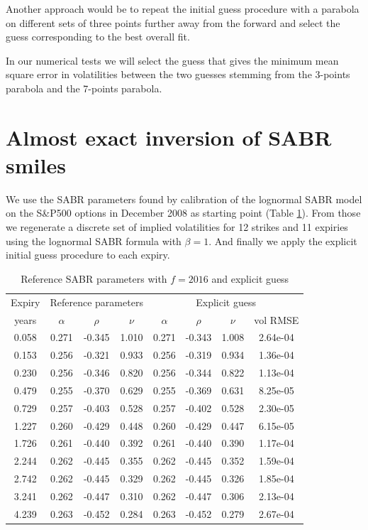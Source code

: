 \documentclass[]{rAMF2e}
\begin{document}
Another approach would be to repeat the initial guess procedure with a parabola on different sets of three points further away from the forward and select the guess corresponding to the best overall fit.

In our numerical tests we will select the guess that gives the minimum mean square error in volatilities between the two guesses stemming from the 3-points parabola and the 7-points parabola.
\section{Almost exact inversion of SABR smiles}
We use the SABR parameters found by calibration of the lognormal SABR model on the S\&P500 options in December 2008 as starting point (Table \ref{tbl:smart_initialguess_sabr_input}). From those we regenerate a discrete set of implied volatilities for 12 strikes and 11 expiries using the lognormal SABR formula with $\beta = 1$. And finally we apply the explicit initial guess procedure to each expiry.


\begin{table}[h]
\begin{center}
\caption{\label{tbl:smart_initialguess_sabr_input}Reference SABR parameters with $f=2016$ and explicit guess}
\begin{tabular}{c|c c c|c c c c}
\hline
Expiry & \multicolumn{3}{|c|}{Reference parameters} & \multicolumn{4}{|c}{Explicit guess}\\
years & $\alpha$ & $\rho$ & $\nu$ & $\alpha$ & $\rho$ & $\nu$ & vol RMSE \\ 
\hline
0.058&	0.271&	-0.345&	1.010 & 0.271 & -0.343 & 1.008 & 2.64e-04 \\
0.153&	0.256&	-0.321&	0.933 & 0.256 & -0.319 & 0.934 & 1.36e-04\\
0.230&	0.256&	-0.346&	0.820 & 0.256 & -0.344 & 0.822 & 1.13e-04\\
0.479&	0.255&	-0.370&	0.629 & 0.255 & -0.369 & 0.631 & 8.25e-05\\
0.729&	0.257&	-0.403&	0.528 & 0.257 & -0.402 & 0.528 & 2.30e-05\\
1.227&	0.260&	-0.429&	0.448 & 0.260 & -0.429 & 0.447 & 6.15e-05\\
1.726&	0.261&	-0.440&	0.392 & 0.261 & -0.440 & 0.390 & 1.17e-04\\
2.244&	0.262&	-0.445&	0.355 & 0.262 & -0.445 & 0.352 & 1.59e-04\\
2.742&	0.262&	-0.445&	0.329 & 0.262 & -0.445 & 0.326 & 1.85e-04\\
3.241&	0.262&	-0.447&	0.310 & 0.262 & -0.447 & 0.306 & 2.13e-04\\
4.239&	0.263&	-0.452&	0.284 & 0.263 & -0.452 & 0.279 & 2.67e-04\\
\hline
\end{tabular}
\end{center}
\end{table}
\end{document}
